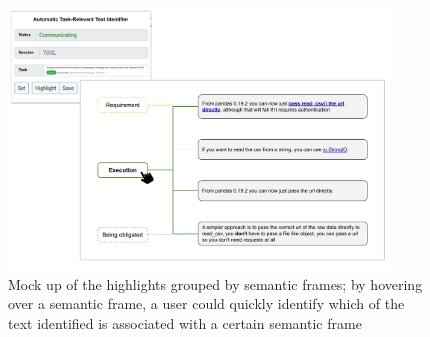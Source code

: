 \begin{figure}
    \centering
    \includegraphics[width=0.90\textwidth]{fig/cp7/semantic-cues}
    \caption{Mock up of the highlights grouped by semantic frames; by hovering over a semantic frame, a user could quickly identify which of the text identified is associated with a certain semantic frame}
    \label{fig:semantic-cues}
\end{figure}





